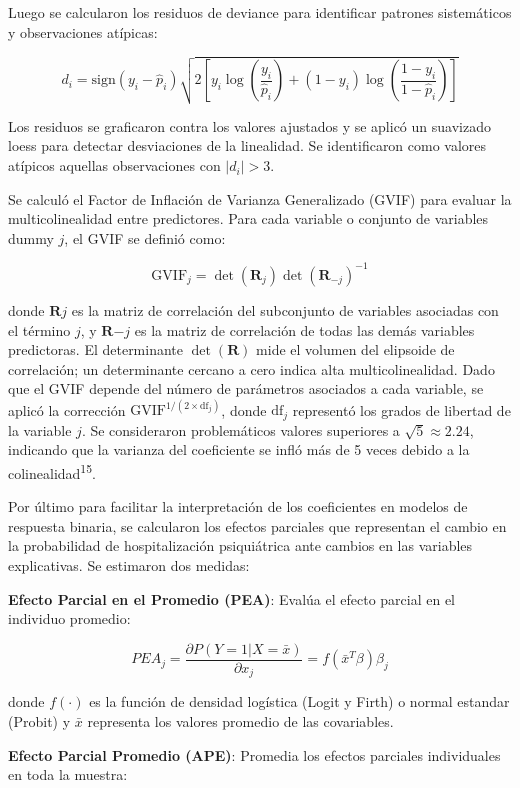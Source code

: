 \documentclass[
  spanish,
  10pt,
]{article}
\begin{document}
Luego se calcularon los residuos de deviance para identificar patrones
sistemáticos y observaciones atípicas:

\[d_i = \text{sign}(y_i - \hat{p}_i) \sqrt{2\left[y_i \log\left(\frac{y_i}{\hat{p}_i}\right) + (1-y_i)\log\left(\frac{1-y_i}{1-\hat{p}_i}\right)\right]}\]

Los residuos se graficaron contra los valores ajustados y se aplicó un
suavizado loess para detectar desviaciones de la linealidad. Se
identificaron como valores atípicos aquellas observaciones con
\(|d_i| > 3\).

Se calculó el Factor de Inflación de Varianza Generalizado (GVIF) para
evaluar la multicolinealidad entre predictores. Para cada variable o
conjunto de variables dummy \(j\), el GVIF se definió como:

\[\text{GVIF}_j = \det(\mathbf{R}_j)\det(\mathbf{R}_{-j})^{-1}\]

donde \(\mathbf{R}j\) es la matriz de correlación del subconjunto de
variables asociadas con el término \(j\), y \(\mathbf{R}{-j}\) es la
matriz de correlación de todas las demás variables predictoras. El
determinante \(\det(\mathbf{R})\) mide el volumen del elipsoide de
correlación; un determinante cercano a cero indica alta
multicolinealidad. Dado que el GVIF depende del número de parámetros
asociados a cada variable, se aplicó la corrección
\(\text{GVIF}^{1/(2 \times \text{df}_j)}\), donde \(\text{df}_j\)
representó los grados de libertad de la variable \(j\). Se consideraron
problemáticos valores superiores a \(\sqrt{5} \approx 2.24\), indicando
que la varianza del coeficiente se infló más de 5 veces debido a la
colinealidad\textsuperscript{15}.

Por último para facilitar la interpretación de los coeficientes en
modelos de respuesta binaria, se calcularon los efectos parciales que
representan el cambio en la probabilidad de hospitalización psiquiátrica
ante cambios en las variables explicativas. Se estimaron dos medidas:

\textbf{Efecto Parcial en el Promedio (PEA)}: Evalúa el efecto parcial
en el individuo promedio:

\[PEA_j = \frac{\partial P(Y=1|X=\bar{x})}{\partial x_j} = f(\bar{x}^T\beta)\beta_j\]

donde \(f(\cdot)\) es la función de densidad logística (Logit y Firth) o
normal estandar (Probit) y \(\bar{x}\) representa los valores promedio
de las covariables.

\textbf{Efecto Parcial Promedio (APE)}: Promedia los efectos parciales
individuales en toda la muestra:
\end{document}
